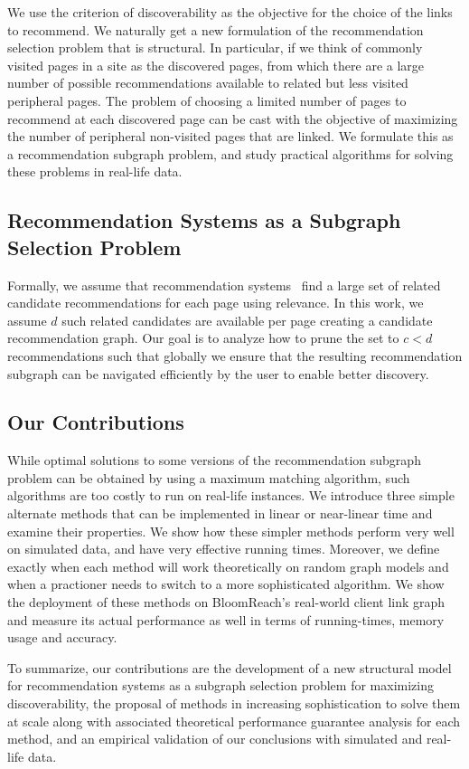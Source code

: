 We use the criterion of discoverability as the objective for the choice of the links to recommend. We naturally get a new formulation of the recommendation selection problem that is structural. In particular, if we think of commonly visited pages in a site as the discovered pages, from which there are a large number of possible recommendations available to related but less visited peripheral pages. The problem of choosing a limited number of pages to recommend at each discovered page can be cast with the objective of maximizing the number of peripheral non-visited pages that are linked. We formulate this as a recommendation subgraph problem, and study practical algorithms for solving these problems in real-life data. 

\subsection{Recommendation Systems as a Subgraph Selection Problem}

Formally, we assume that recommendation systems~\cite{Schafer1999, Adomavicius2005,
  Resnick1997} find a large set of related candidate recommendations
for each page using relevance. In this work, we assume $d$
such related candidates are available per page creating a candidate recommendation graph.
Our goal is to analyze how to prune the set to $c < d$ recommendations such that
globally we ensure that the resulting recommendation subgraph can be navigated efficiently by the user to enable better discovery.

\subsection{Our Contributions}
While optimal solutions to some versions of the recommendation subgraph problem can be obtained by using a maximum matching algorithm, such algorithms are too costly to run on real-life instances. We introduce three simple alternate methods that can be implemented in linear or near-linear time and examine their properties. We show how these simpler methods perform very well on simulated data, and have very effective running times. Moreover, we define exactly when 
each method will work theoretically on random graph models and when a practioner needs to switch to a more sophisticated algorithm. We show the deployment of these methods on BloomReach's real-world client link graph and measure its
actual performance as well in terms of running-times, memory usage and accuracy.

To summarize, our contributions are the development of a new structural model for recommendation systems as a subgraph selection problem for maximizing discoverability, the proposal of methods in increasing sophistication to solve them at scale along with associated theoretical performance guarantee analysis for each method, and an empirical validation of our conclusions with simulated and real-life data.

